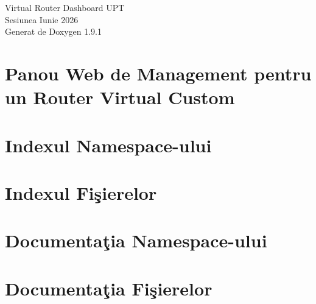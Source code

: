 \let\mypdfximage\pdfximage\def\pdfximage{\immediate\mypdfximage}\documentclass[twoside]{book}
\newcommand{\+}{\discretionary{\mbox{\scriptsize$\hookleftarrow$}}{}{}}
\newcommand{\clearemptydoublepage}{%
  \newpage{\pagestyle{empty}\cleardoublepage}%
}
\begin{document}
\raggedbottom

\hypersetup{pageanchor=false,
             bookmarksnumbered=true,
             pdfencoding=unicode
            }
\begin{titlepage}
\vspace*{7cm}
\begin{center}%
{\Large Virtual Router Dashboard UPT \\[1ex]\large Sesiunea Iunie 2026 }\\
\vspace*{1cm}
{\large Generat de Doxygen 1.9.1}\\
\end{center}
\end{titlepage}
\clearemptydoublepage
{}
\tableofcontents
\clearemptydoublepage
{}
\hypersetup{pageanchor=true}

\chapter{Panou Web de Management pentru un Router Virtual Custom}
\label{index}\hypertarget{index}{}
\chapter{Indexul Namespace-\/ului}

\chapter{Indexul Fişierelor}

\chapter{Documentaţia Namespace-\/ului}

\chapter{Documentaţia Fişierelor}





\backmatter
\newpage
{}
\clearemptydoublepage
{}
\printindex
\end{document}
